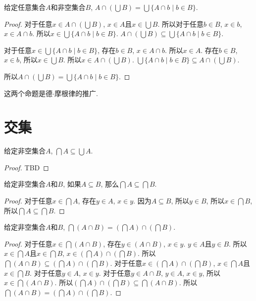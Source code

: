 \begin{proposition}
	给定任意集合$A$和非空集合$B$, $A\cap (\bigcup B)=\bigcup \{A\cap b\mid b\in B\}$.
\end{proposition}

\begin{proof}
	对于任意$x\in A\cap (\bigcup B)$, $x\in A$且$x\in \bigcup B$. 所以对于任意$b\in B$, $x\in b$, $x\in A\cap b$. 所以$x\in \bigcup \{A\cap b\mid b\in B\}$. $A\cap (\bigcup B)\subseteq \bigcup \{A\cap b\mid b\in B\}$.
	
	对于任意$x\in \bigcup \{A\cap b\mid b\in B\}$, 存在$b\in B$, $x\in A\cap b$. 所以$x\in A$. 存在$b\in B$, $x\in b$, 所以$x\in \bigcup B$. 所以$x\in A\cap (\bigcup B)$. $\bigcup \{A\cap b\mid b\in B\}\subseteq A\cap (\bigcup B)$.
	
	所以$A\cap (\bigcup B)=\bigcup \{A\cap b\mid b\in B\}$.
\end{proof}

这两个命题是德$\cdot$摩根律的推广.

\section{交集}
\begin{proposition}
	给定非空集合$A$, $\bigcap A\subseteq \bigcup A$.
\end{proposition}

\begin{proof}
	TBD
\end{proof}

\begin{proposition}
	给定非空集合$A$和$B$, 如果$A\subseteq B$, 那么$\bigcap A\subseteq \bigcap B$.
\end{proposition}

\begin{proof}
	对于任意$x\in \bigcap A$, 存在$y\in A$, $x\in y$. 因为$A\subseteq B$, 所以$y\in B$, 所以$x\in \bigcap B$, 所以$\bigcap A\subseteq \bigcap B$.
\end{proof}

\begin{proposition}
	给定非空集合$A$和$B$, $\bigcap (A\cap B)=(\bigcap A)\cap (\bigcap B)$.
\end{proposition}

\begin{proof}
	对于任意$x\in \bigcap (A\cap B)$, 存在$y\in (A\cap B)$, $x\in y$. $y\in A$且$y\in B$. 所以$x\in \bigcap A$且$x\in \bigcap B$, $x\in (\bigcap A)\cap (\bigcap B)$. 所以$\bigcap (A\cap B)\subseteq (\bigcap A)\cap (\bigcap B)$. 对于任意$x\in (\bigcap A)\cap (\bigcap B)$, $x\in \bigcap A$且$x\in \bigcap B$. 对于任意$y\in A$, $x\in y$. 对于任意$y\in A\cap B$, $y\in A$, $x\in y$, 所以$x\in \bigcap (A\cap B)$. 所以$(\bigcap A)\cap (\bigcap B)\subseteq \bigcap (A\cap B)$. 所以$\bigcap (A\cap B)=(\bigcap A)\cap (\bigcap B)$.
\end{proof}

